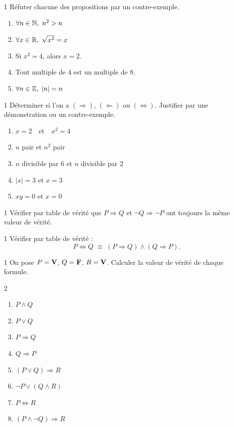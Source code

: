 \begin{exo}{1}
R\'efuter chacune des propositions par un contre-exemple.
\begin{enumerate}
  \item $\forall n \in \mathbb{N},\ n^2 > n$
  \item $\forall x \in \mathbb{R},\ \sqrt{x^2} = x$
  \item Si $x^2 = 4$, alors $x = 2$.
  \item Tout multiple de $4$ est un multiple de $8$.
  \item $\forall n \in \mathbb{Z},\ |n| = n$
\end{enumerate}
\end{exo}

\begin{exo}{1}
D\'eterminer si l'on a $(\Rightarrow)$, $(\Leftarrow)$ ou $(\Leftrightarrow)$.
Justifier par une d\'emonstration ou un contre-exemple.
\begin{enumerate}
  \item $x = 2 \quad \text{et} \quad x^2 = 4$
  \item $n$ pair \quad et \quad $n^2$ pair
  \item $n$ divisible par $6$ \quad et \quad $n$ divisible par $2$
  \item $|x| = 3$ \quad et \quad $x = 3$
  \item $xy = 0$ \quad et \quad $x = 0$
\end{enumerate}
\end{exo}

\begin{exo}{1}
V\'erifier par table de v\'erit\'e que $P \Rightarrow Q$ et
$\lnot Q \Rightarrow \lnot P$ ont toujours la m\^eme valeur de v\'erit\'e.
\end{exo}

\begin{exo}{1}
V\'erifier par table de v\'erit\'e :
$$P \Leftrightarrow Q \;\equiv\; (P \Rightarrow Q) \land (Q \Rightarrow P).$$
\end{exo}

\begin{exo}{1}
On pose $P = \textbf{V}$, $Q = \textbf{F}$, $R = \textbf{V}$.
Calculer la valeur de v\'erit\'e de chaque formule.
\begin{multicols}{2}
\begin{enumerate}
  \item $P \land Q$
  \item $P \lor Q$
  \item $P \Rightarrow Q$
  \item $Q \Rightarrow P$
  \item $(P \lor Q) \Rightarrow R$
  \item $\lnot P \lor (Q \land R)$
  \item $P \Leftrightarrow R$
  \item $(P \land \lnot Q) \Rightarrow R$
\end{enumerate}
\end{multicols}
\end{exo}

